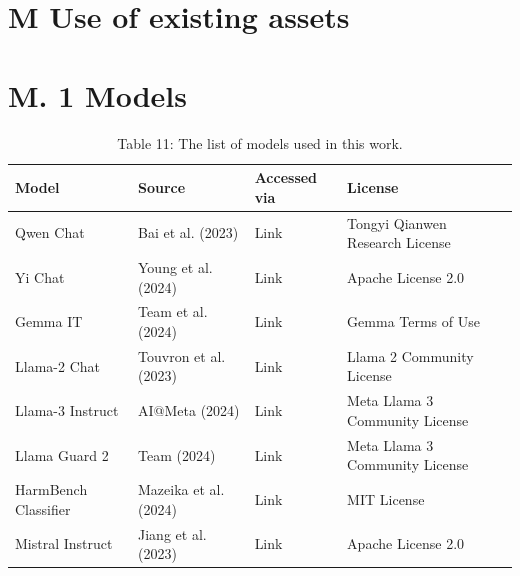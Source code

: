 \documentclass[10pt]{article}
\begin{document}
\section*{M Use of existing assets}
\section*{M. 1 Models}
\begin{table}[h]
\begin{center}
\captionsetup{labelformat=empty}
\caption{Table 11: The list of models used in this work.}
\begin{tabular}{|l|l|l|l|}
\hline
Model & Source & Accessed via & License \\
\hline
Qwen Chat & Bai et al. (2023) & Link & Tongyi Qianwen Research License \\
\hline
Yi Chat & Young et al. (2024) & Link & Apache License 2.0 \\
\hline
Gemma IT & Team et al. (2024) & Link & Gemma Terms of Use \\
\hline
Llama-2 Chat & Touvron et al. (2023) & Link & Llama 2 Community License \\
\hline
Llama-3 Instruct & AI@Meta (2024) & Link & Meta Llama 3 Community License \\
\hline
Llama Guard 2 & Team (2024) & Link & Meta Llama 3 Community License \\
\hline
HarmBench Classifier & Mazeika et al. (2024) & Link & MIT License \\
\hline
Mistral Instruct & Jiang et al. (2023) & Link & Apache License 2.0 \\
\hline
\end{tabular}
\end{center}
\end{table}
\end{document}
